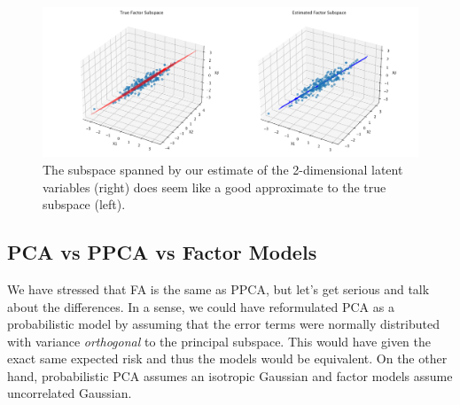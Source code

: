 \begin{example}
    \begin{figure}[H]
      \centering 
      \includegraphics[scale=0.4]{img/factor.png}
      \caption{The subspace spanned by our estimate of the 2-dimensional latent variables (right) does seem like a good approximate to the true subspace (left).} 
    \end{figure}
  \end{example}

\subsection{PCA vs PPCA vs Factor Models} 

  We have stressed that FA is the same as PPCA, but let's get serious and talk about the differences. In a sense, we could have reformulated PCA as a probabilistic model by assuming that the error terms were normally distributed with variance \textit{orthogonal} to the principal subspace. This would have given the exact same expected risk and thus the models would be equivalent. On the other hand, probabilistic PCA assumes an isotropic Gaussian and factor models assume uncorrelated Gaussian. 


